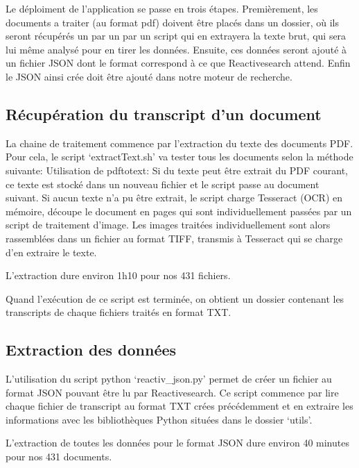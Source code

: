 

Le déploiment de l'application se passe en trois étapes.
Premièrement, les documents a traiter (au format pdf) doivent être placés dans un dossier, où ils seront récupérés un par un par un script qui en extrayera la texte brut, qui sera lui même analysé pour en tirer les données.
Ensuite, ces données seront ajouté à un fichier JSON dont le format correspond à ce que Reactivesearch attend.
Enfin le JSON ainsi crée doit être ajouté dans notre moteur de recherche.

\subsection{Récupération du transcript d'un document}
La chaine de traitement commence par l'extraction du texte des documents PDF.
Pour cela, le script `extractText.sh' va tester tous les documents selon la méthode suivante:\newline
Utilisation de pdftotext: Si du texte peut être extrait du PDF courant, ce texte est stocké dans un nouveau fichier et le script passe au document suivant.\newline
Si aucun texte n'a pu être extrait, le script charge Tesseract (OCR) en mémoire, découpe le document en pages qui sont individuellement passées par un script de traitement d'image.
Les images traitées individuellement sont alors rassemblées dans un fichier au format TIFF, transmis à Tesseract qui se charge d'en extraire le texte.

L'extraction dure environ 1h10 pour nos 431 fichiers.

Quand l'exécution de ce script est terminée, on obtient un dossier contenant les transcripts de chaque fichiers traités en format TXT.

\subsection{Extraction des données}
L'utilisation du script python `reactiv\_json.py' permet de créer un fichier au format JSON pouvant être lu par Reactivesearch.
Ce script commence par lire chaque fichier de transcript au format TXT crées précédemment et en extraire les informations avec les bibliothèques Python situées dans le dossier `utils'.

L'extraction de toutes les données pour le format JSON dure environ 40 minutes pour nos 431 documents.

